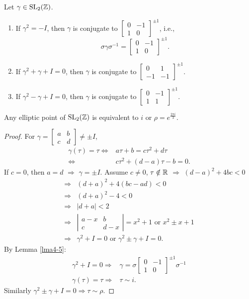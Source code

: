 \begin{lemma}\label{lma4-5}
  Let $\gamma \in \operatorname{SL}_2(\mathbb{Z})$.
  \begin{enumerate}
    \item 
  If $\gamma^2=-I$, then $\gamma$ is conjugate to 
  $\begin{bmatrix} 0 & -1\\1&0 \end{bmatrix} ^{\pm 1}$, i.e., 
  \[
    \sigma \gamma\sigma^{-1} = \begin{bmatrix} 0&-1\\1&0 \end{bmatrix} ^{\pm 1}.
  \]
    \item 
    If $\gamma^2+\gamma+I=0$, then $\gamma$ is conjugate to $\begin{bmatrix} 0&1\\-1&-1 \end{bmatrix} ^{\pm 1}$.
    \item
      If $\gamma^2-\gamma+I=0$, then $\gamma$ is conjugate to $\begin{bmatrix} 0&-1\\1&1 \end{bmatrix}^{\pm 1} $.
  \end{enumerate}
\end{lemma}
\begin{lemma}
  Any elliptic point of $\operatorname{SL}_2(\mathbb{Z})$ is equivalent to $i$ or $\rho=e^{ \frac{2\pi i}{3}}$.
\end{lemma}
\begin{proof}
  For $\gamma=\begin{bmatrix} a&b\\c&d \end{bmatrix} \neq \pm I$, 
  \begin{align*}
    \gamma(\tau )=\tau \Leftrightarrow & a\tau +b=c\tau^2 +d \tau \\
    \Leftrightarrow & c\tau ^2+(d-a)\tau -b=0
  .\end{align*}
  If $c=0$, then $a=d$ $\Rightarrow$ $\gamma=\pm I$. Assume $c\neq 0$, $\tau \notin \mathbb{R}$ $\Rightarrow$ $(d-a)^2+4bc<0$
  \begin{align*}
    \Rightarrow & (d+a)^2+4(bc-ad)<0\\
    \Rightarrow&(d+a)^2-4<0\\
    \Rightarrow & |d+a|<2\\
    \Rightarrow & \left| \begin{matrix} a-x&b\\c&d-x \end{matrix} \right|=x^2+1 \text{ or } x^2\pm x+1\\
    \Rightarrow & \gamma^2+I=0 \text{ or } \gamma^2\pm \gamma+I=0
  .\end{align*}
  By Lemma \ref{lma4-5}: 
  \begin{align*}
    \gamma^2+I=0 \Rightarrow & \gamma=\sigma \begin{bmatrix} 0&-1\\1&0 \end{bmatrix} ^{\pm 1}\sigma^{-1}\\
    \gamma(\tau )=\tau \Rightarrow&\tau \sim i
  .\end{align*}
  Similarly $\gamma^2\pm \gamma+I=0 \Rightarrow\tau \sim\rho$.
\end{proof}
